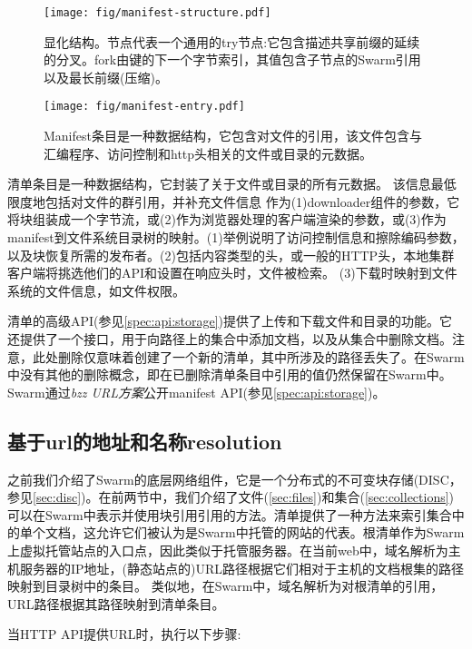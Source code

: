 \begin{figure}[htbp]
\centering
\texttt{[image: fig/manifest-structure.pdf]}
\caption[清单结构\statusgreen]{显化结构。节点代表一个通用的try节点:它包含描述共享前缀的延续的分叉。fork由键的下一个字节索引，其值包含子节点的Swarm引用以及最长前缀(压缩)。}
\label{fig:manifest-structure}
\end{figure}

\begin{figure}[htbp]
\centering
\texttt{[image: fig/manifest-entry.pdf]}
\caption[清单条目\statusgreen]{Manifest条目是一种数据结构，它包含对文件的引用，该文件包含与汇编程序、访问控制和http头相关的文件或目录的元数据。}
\label{fig:manifest-entry}
\end{figure}

清单条目是一种数据结构，它封装了关于文件或目录的所有元数据。
该信息最低限度地包括对文件的群引用，并补充文件信息
作为(1)downloader组件的参数，它将块组装成一个字节流，或(2)作为浏览器处理的客户端渲染的参数，或(3)作为manifest到文件系统目录树的映射。(1)举例说明了访问控制信息和擦除编码参数，以及块恢复所需的发布者。(2)包括内容类型的头，或一般的HTTP头，本地集群客户端将挑选他们的API和设置在响应头时，文件被检索。
(3)下载时映射到文件系统的文件信息，如文件权限。

清单的高级API(参见\ref{spec:api:storage})提供了上传和下载文件和目录的功能。它还提供了一个接口，用于向路径上的集合中添加文档，以及从集合中删除文档。注意，此处删除仅意味着创建了一个新的清单，其中所涉及的路径丢失了。在Swarm中没有其他的删除概念，即在已删除清单条目中引用的值仍然保留在Swarm中。Swarm通过\emph{bzz URL方案}公开manifest API(参见\ref{spec:api:storage})。

\subsection{基于url的地址和名称resolution\statusgreen}\label{sec:urls}

之前我们介绍了Swarm的底层网络组件，它是一个分布式的不可变块存储(DISC，参见\ref{sec:disc})。在前两节中，我们介绍了文件(\ref{sec:files})和集合(\ref{sec:collections})可以在Swarm中表示并使用块引用引用的方法。清单提供了一种方法来索引集合中的单个文档，这允许它们被认为是Swarm中托管的网站的代表。根清单作为Swarm上虚拟托管站点的入口点，因此类似于托管服务器。在当前web中，域名解析为主机服务器的IP地址，(静态站点的)URL路径根据它们相对于主机的文档根集的路径映射到目录树中的条目。
类似地，在Swarm中，域名解析为对根清单的引用，URL路径根据其路径映射到清单条目。

当HTTP API提供URL时，执行以下步骤:

